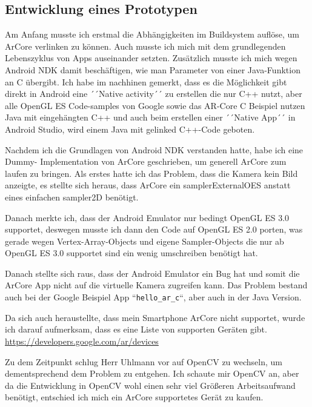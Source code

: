 \subsection{Entwicklung eines Prototypen}
Am Anfang musste ich erstmal die Abhängigkeiten im Buildsystem auflöse, um
ArCore verlinken zu können. Auch musste ich mich mit dem grundlegenden Lebenszyklus von Apps
auseinander setzten. Zusätzlich musste ich mich wegen Android NDK damit beschäftigen, wie man
Parameter von einer Java-Funktion an C übergibt.
Ich habe im nachhinen gemerkt, dass es die Möglichkeit gibt direkt in Android eine
´´Native activity´´ zu erstellen die nur C++ nutzt, aber alle OpenGL ES Code-samples von Google
sowie das AR-Core C Beispiel nutzen Java mit eingehängten C++ und auch beim erstellen einer
´´Native App´´ in Android Studio, wird einem Java mit gelinked C++-Code geboten.
\par
Nachdem ich die Grundlagen von Android NDK verstanden hatte, habe ich eine Dummy-
Implementation von ArCore geschrieben, um generell ArCore zum laufen zu bringen.
Als erstes hatte ich das Problem, dass die Kamera kein Bild anzeigte, es stellte sich
heraus, dass ArCore ein samplerExternalOES anstatt eines einfachen sampler2D benötigt.
\par
Danach merkte ich, dass der Android Emulator nur bedingt OpenGL ES 3.0 supportet,
deswegen musste ich dann den Code auf OpenGL ES 2.0 porten, was gerade wegen
Vertex-Array-Objects und eigene Sampler-Objects die nur ab OpenGL ES 3.0 supportet sind ein
wenig umschreiben benötigt hat.
\par
Danach stellte sich raus, dass der Android Emulator ein Bug hat und somit die ArCore App nicht
auf die virtuelle Kamera zugreifen kann. Das Problem bestand auch bei der Google Beispiel App
``\verb|hello_ar_c|``, aber auch in der Java Version.
\par
Da sich auch heraustellte, dass mein Smartphone ArCore nicht supportet, wurde ich darauf
aufmerksam, dass es eine Liste von supporten Geräten gibt. \url{https://developers.google.com/ar/devices}
\par
Zu dem Zeitpunkt schlug Herr Uhlmann vor auf OpenCV zu wechseln, um dementsprechend dem Problem
zu entgehen. Ich schaute mir OpenCV an, aber da die Entwicklung in OpenCV wohl einen sehr viel
Größeren Arbeitsaufwand benötigt, entschied ich mich ein ArCore supportetes Gerät zu kaufen.

